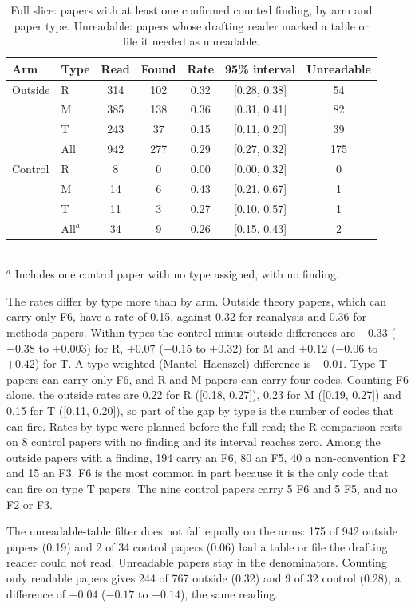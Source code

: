\documentclass[reprint,amsmath,amssymb,aps,superscriptaddress,nofootinbib]{revtex4-2}
\begin{document}
\begin{table}[t]
\caption{Full slice: papers with at least one confirmed counted finding, by arm and paper type. Unreadable: papers whose drafting reader marked a table or file it needed as unreadable.}
\label{tab:full}
\centering\small\setlength{\tabcolsep}{2pt}
\begin{tabular}{llccccc}
\hline\hline
Arm & Type & Read & Found & Rate & 95\% interval & Unreadable \\ \hline
Outside & R & 314 & 102 & 0.32 & [0.28, 0.38] & 54 \\
 & M & 385 & 138 & 0.36 & [0.31, 0.41] & 82 \\
 & T & 243 & 37 & 0.15 & [0.11, 0.20] & 39 \\
 & All & 942 & 277 & 0.29 & [0.27, 0.32] & 175 \\ \hline
Control & R & 8 & 0 & 0.00 & [0.00, 0.32] & 0 \\
 & M & 14 & 6 & 0.43 & [0.21, 0.67] & 1 \\
 & T & 11 & 3 & 0.27 & [0.10, 0.57] & 1 \\
 & All$^a$ & 34 & 9 & 0.26 & [0.15, 0.43] & 2 \\
\hline\hline
\end{tabular}
\\[2pt]{\footnotesize $^a$ Includes one control paper with no type assigned, with no finding.}
\end{table}

The rates differ by type more than by arm. Outside theory papers, which can carry only F6, have a rate of 0.15, against 0.32 for reanalysis and 0.36 for methods papers. Within types the control-minus-outside differences are $-0.33$ ($-0.38$ to $+0.003$) for R, $+0.07$ ($-0.15$ to $+0.32$) for M and $+0.12$ ($-0.06$ to $+0.42$) for T. A type-weighted (Mantel--Haenszel) difference is $-0.01$. Type T papers can carry only F6, and R and M papers can carry four codes. Counting F6 alone, the outside rates are 0.22 for R ([0.18, 0.27]), 0.23 for M ([0.19, 0.27]) and 0.15 for T ([0.11, 0.20]), so part of the gap by type is the number of codes that can fire. Rates by type were planned before the full read; the R comparison rests on 8 control papers with no finding and its interval reaches zero. Among the outside papers with a finding, 194 carry an F6, 80 an F5, 40 a non-convention F2 and 15 an F3. F6 is the most common in part because it is the only code that can fire on type T papers. The nine control papers carry 5 F6 and 5 F5, and no F2 or F3.

The unreadable-table filter does not fall equally on the arms: 175 of 942 outside papers (0.19) and 2 of 34 control papers (0.06) had a table or file the drafting reader could not read. Unreadable papers stay in the denominators. Counting only readable papers gives 244 of 767 outside (0.32) and 9 of 32 control (0.28), a difference of $-0.04$ ($-0.17$ to $+0.14$), the same reading.
\end{document}

